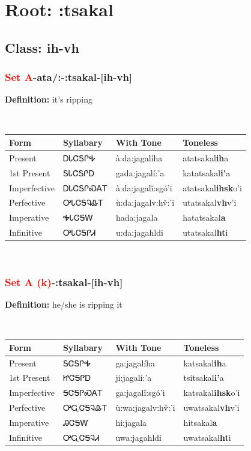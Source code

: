 \needspace{4in}
\section*{Root: :tsakal}
\nopagebreak
{}
\needspace{3in}
\subsection*{Class: ih-vh}
\nopagebreak
\needspace{2in}
\subsubsection*{\textcolor{Red}{Set A}{-}ata/:{-}\textbf{:tsakal}{-}[ih-vh]}
\nopagebreak
\textbf{Definition: } it{\textquoteright}s ripping
\\[0.5em]
\begin{tabularx}{\textwidth}{l X X X}%
\toprule%
\textbf{Form}&\textbf{Syllabary}&\textbf{With Tone}&\textbf{Toneless}\\%
\midrule%
Present&ᎠᏓᏣᎦᎵᎭ&à:da:jagalíha&atatsakal\textbf{ih}a\\%
1st Present&ᎦᏓᏣᎦᎵᎠ&gada:jagalí:’a&katatsakal\textbf{i'}a\\%
Imperfective&ᎠᏓᏣᎦᎵᏍᎪᎢ&à:da:jagalǐ:sgó’i&atatsakal\textbf{ihsk}o'i\\%
Perfective&ᎤᏓᏣᎦᎸᎲᎢ&ù:da:jagalv:hv̌:’i&utatsakal\textbf{vh}v'i\\%
Imperative&ᎭᏓᏣᎦᎳ&hada:jagala&hatatsakal\textbf{a}\\%
Infinitive&ᎤᏓᏣᎦᎵᏗ&u:da:jagahldi&utatsakal\textbf{ht}i\\%
\bottomrule%
\end{tabularx}
\\[1em]
\needspace{2in}
\subsubsection*{\textcolor{Red}{Set A (k)}{-}\textbf{:tsakal}{-}[ih-vh]}
\nopagebreak
\textbf{Definition: } he/she is ripping it
\\[0.5em]
\begin{tabularx}{\textwidth}{l X X X}%
\toprule%
\textbf{Form}&\textbf{Syllabary}&\textbf{With Tone}&\textbf{Toneless}\\%
\midrule%
Present&ᎦᏣᎦᎵᎭ&ga:jagalíha&katsakal\textbf{ih}a\\%
1st Present&ᏥᏣᎦᎵᎠ&ji:jagalí:’a&tsitsakal\textbf{i'}a\\%
Imperfective&ᎦᏣᎦᎵᏍᎪᎢ&ga:jagalǐ:sgó’i&katsakal\textbf{ihsk}o'i\\%
Perfective&ᎤᏩᏣᎦᎸᎲᎢ&ù:wa:jagalv:hv̌:’i&uwatsakal\textbf{vh}v'i\\%
Imperative&ᎯᏣᎦᎳ&hi:jagala&hitsakal\textbf{a}\\%
Infinitive&ᎤᏩᏣᎦᎸᏗ&uwa:jagahldi&uwatsakal\textbf{ht}i\\%
\bottomrule%
\end{tabularx}
\\[1em]